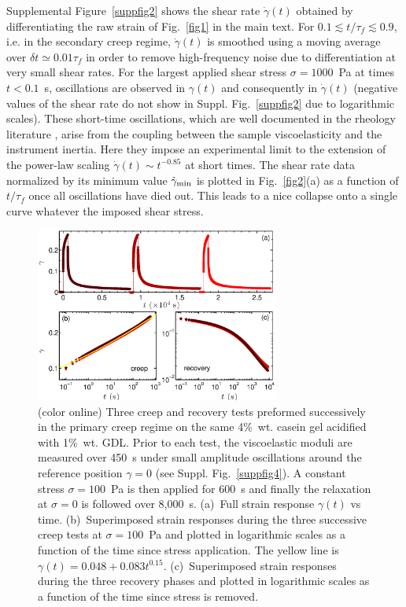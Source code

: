 \documentclass[twocolumn,superscriptaddress,showpacs,preprintnumbers,amsmath,amssymb,prl]{revtex4}
\newcommand\gp{\dot\gamma}
\begin{document}
Supplemental Figure~\ref{suppfig2} shows the shear rate $\gp(t)$ obtained by differentiating the raw strain of Fig.~\ref{fig1} in the main text. For $0.1\lesssim t/\tau_f\lesssim 0.9$, i.e. in the secondary creep regime, $\gp(t)$ is smoothed using a moving average over $\delta t\simeq 0.01\tau_f$ in order to remove high-frequency noise due to differentiation at very small shear rates. For the largest applied shear stress $\sigma=1000$~Pa at times $t<0.1$~s, oscillations are observed in $\gamma(t)$ and consequently in $\gp(t)$ (negative values of the shear rate do not show in Suppl. Fig.~\ref{suppfig2} due to logarithmic scales). These short-time oscillations, which are well documented in the rheology literature \cite{Benmouffok-Benbelkacem:2010}, arise from the coupling between the sample viscoelasticity and the instrument inertia. Here they impose an experimental limit to the extension of the power-law scaling $\gp(t)\sim t^{-0.85}$ at short times. The shear rate data normalized by its minimum value $\gp_{\rm min}$ is plotted in Fig.~\ref{fig2}(a) as a function of $t/\tau_f$ once all oscillations have died out. This leads to a nice collapse onto a single curve whatever the imposed shear stress.

\begin{figure}
\centering
\includegraphics[width=8cm,clip]{SuppFig3.eps}
\caption{(color online) Three creep and recovery tests preformed successively in the primary creep regime on the same 4\%~wt. casein gel acidified with 1\%~wt. GDL. Prior to each test, the viscoelastic moduli are measured over 450~s under small amplitude oscillations around the reference position $\gamma=0$ (see Suppl. Fig.~\ref{suppfig4}). A constant stress $\sigma=100$~Pa is then applied for 600~s and finally the relaxation at $\sigma=0$ is followed over 8,000~s. (a)~Full strain response $\gamma(t)$ vs time. (b)~Superimposed strain responses during the three successive creep tests at $\sigma=100$~Pa and plotted in logarithmic scales as a function of the time since stress application. The yellow line is $\gamma(t)= 0.048+0.083 t^{0.15}$. (c)~Superimposed strain responses during the three recovery phases and plotted in logarithmic scales as a function of the time since stress is removed.
\label{suppfig3}}
\end{figure} 
\end{document}
